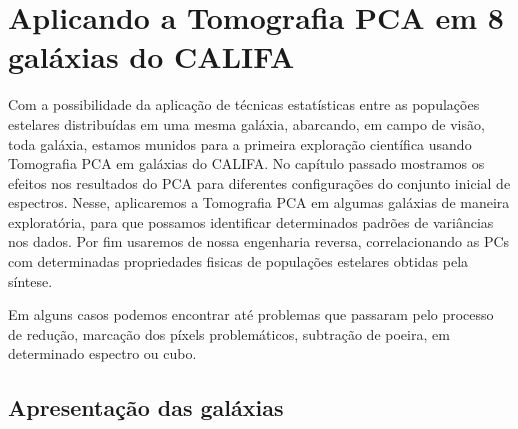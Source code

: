 


\chapter{Aplicando a Tomografia PCA em 8 galáxias do CALIFA}
\label{sec:result}

Com a possibilidade da aplicação de técnicas estatísticas entre as populações estelares distribuídas em uma mesma
galáxia, abarcando, em campo de visão, toda galáxia, estamos munidos para a primeira exploração científica usando
Tomografia PCA em galáxias do CALIFA. No capítulo passado mostramos os efeitos nos resultados do PCA para diferentes
configurações do conjunto inicial de espectros. Nesse, aplicaremos a Tomografia PCA em algumas galáxias de maneira
exploratória, para que possamos identificar determinados padrões de variâncias nos dados. Por fim usaremos de nossa
engenharia reversa, correlacionando as PCs com determinadas propriedades fisicas de populações estelares obtidas pela
síntese.

\ojo Em alguns casos podemos encontrar até problemas que passaram pelo processo de redução, marcação dos píxels
problemáticos, subtração de poeira, em determinado espectro ou cubo.

\section{Apresentação das galáxias}
\label{sec:result:apres}


